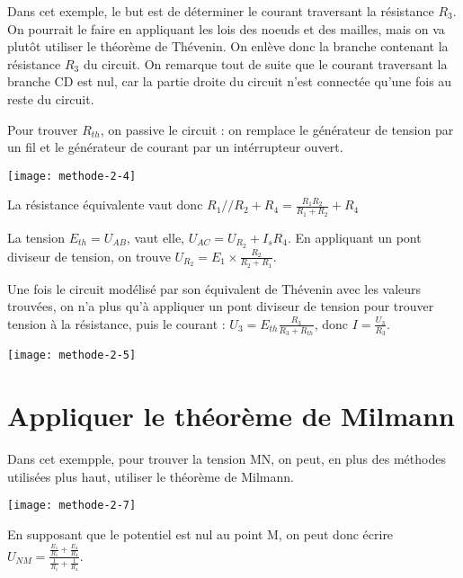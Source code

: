 \documentclass[french]{yLectureNote}
\begin{document}
Dans cet exemple, le but est de déterminer le courant traversant la résistance \(R_3\). On pourrait le faire en appliquant les lois des noeuds et des mailles, mais on va plut\^ot utiliser le théorème de Thévenin. On enlève donc la branche contenant la résistance \(R_3\) du circuit. On remarque tout de suite que le courant traversant la branche CD est nul, car la partie droite du circuit n'est connectée qu'une fois au reste du circuit.

Pour trouver  \(R_{th}\), on passive le circuit : on remplace le générateur de tension par un fil et le générateur de courant par un intérrupteur ouvert.

\texttt{[image: methode-2-4]}

La résistance équivalente  vaut donc \(R_1//R_2 + R_4 = \frac{R_1R_2}{R_1+R_2} + R_4\)

La tension \(E_{th} = U_{AB}\), vaut elle, \(U_{AC} = U_{R_2} + I_sR_4\). En appliquant un pont diviseur de tension, on trouve \(U_{R_2} = E_1\times \frac{R_2}{R_2+R_1}\).

Une fois le circuit modélisé par son équivalent de Thévenin avec les valeurs trouvées, on n'a plus qu'à appliquer un pont diviseur de tension pour trouver tension à la résistance, puis le courant : \(U_3 = E_{th}\frac{R_3}{R_3+R_{th}}\), donc \(I = \frac{U_3}{R_3}\).

\texttt{[image: methode-2-5]}
\section{Appliquer le théorème de Milmann}
Dans cet exempple, pour trouver la tension MN, on peut, en plus des méthodes utilisées plus haut, utiliser le théorème de Milmann.

\texttt{[image: methode-2-7]}

En supposant que le potentiel est nul au point M, on peut donc écrire \(U_{NM} = \frac{\frac{E_1}{R_1}+ \frac{E_4}{R_4}}{\frac{1}{R_1}+\frac{1}{R_4}}\).
\end{document}
